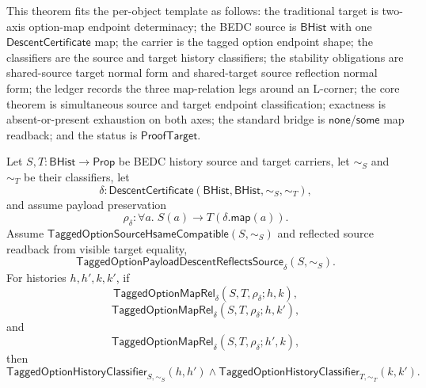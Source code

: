 \begin{theorem}
\label{thm:tagged-option-maprel-l-corner-classifier-coherence}
This theorem fits the per-object template as follows: the traditional target is
two-axis option-map endpoint determinacy; the BEDC source is $\mathsf{BHist}$
with one $\mathsf{DescentCertificate}$ map; the carrier is the tagged option
endpoint shape; the classifiers are the source and target history classifiers;
the stability obligations are shared-source target normal form and
shared-target source reflection normal form; the ledger records the three
map-relation legs around an L-corner; the core theorem is simultaneous source
and target endpoint classification; exactness is absent-or-present exhaustion on
both axes; the standard bridge is $\mathsf{none}$/$\mathsf{some}$ map readback;
and the status is $\mathsf{ProofTarget}$.

Let $S,T:\mathsf{BHist}\to\mathsf{Prop}$ be BEDC history source and target
carriers, let $\sim_S$ and $\sim_T$ be their classifiers, let
$$
\delta:\mathsf{DescentCertificate}(\mathsf{BHist},\mathsf{BHist},\sim_S,\sim_T),
$$
and assume payload preservation
$$
\rho_{\delta}:\forall a.\;S(a)\to T(\delta.\mathsf{map}(a)).
$$
Assume $\mathsf{TaggedOptionSourceHsameCompatible}(S,\sim_S)$ and reflected
source readback from visible target equality,
$$
\mathsf{TaggedOptionPayloadDescentReflectsSource}_{\delta}(S,\sim_S).
$$
For histories $h,h',k,k'$, if
$$
\mathsf{TaggedOptionMapRel}_{\delta}(S,T,\rho_{\delta};h,k),
$$
$$
\mathsf{TaggedOptionMapRel}_{\delta}(S,T,\rho_{\delta};h,k'),
$$
and
$$
\mathsf{TaggedOptionMapRel}_{\delta}(S,T,\rho_{\delta};h',k),
$$
then
$$
\mathsf{TaggedOptionHistoryClassifier}_{S,\sim_S}(h,h')
\land
\mathsf{TaggedOptionHistoryClassifier}_{T,\sim_T}(k,k').
$$
\end{theorem}
